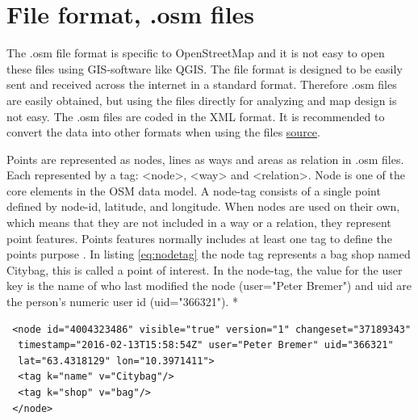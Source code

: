 

 \section{File format, .osm files}
The .osm file format is specific to OpenStreetMap and it is not easy to open these files using GIS-software like QGIS. The file format is designed to be easily sent and received across the internet in a standard format. Therefore .osm files are easily obtained, but using the files directly for analyzing and map design is not easy. The .osm files are coded in the XML format. It is recommended to convert the data into other formats when using the files \href{http://learnosm.org/en/osm-data/file-formats/}{source}. 

Points are represented as nodes, lines as ways and areas as relation in .osm files. Each represented by a tag: <node>, <way> and <relation>. Node is one of the core elements in the OSM data model. A node-tag consists of a single point defined by node-id, latitude, and longitude. When nodes are used on their own, which means that they are not included in a way or a relation, they represent point features. Points features normally includes at least one tag to define the points purpose \cite{OpenStreetMapc}. In listing \ref{eq:nodetag} the node tag represents a bag shop named Citybag, this is called a point of interest. In the node-tag, the value for the user key is the name of who last modified the node (user="Peter Bremer") and uid are the person's numeric user id (uid="366321"). * %

\begin{lstlisting}
 <node id="4004323486" visible="true" version="1" changeset="37189343"
  timestamp="2016-02-13T15:58:54Z" user="Peter Bremer" uid="366321" 
  lat="63.4318129" lon="10.3971411">
  <tag k="name" v="Citybag"/>
  <tag k="shop" v="bag"/>
 </node>
\end{lstlisting}

